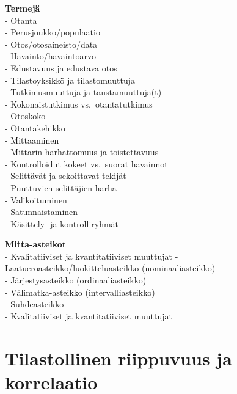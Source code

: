 \documentclass[
]{book}
\begin{document}
\textbf{Termejä}\\
- Otanta\\
- Perusjoukko/populaatio\\
- Otos/otosaineisto/data\\
- Havainto/havaintoarvo\\
- Edustavuus ja edustava otos\\
- Tilastoyksikkö ja tilastomuuttuja\\
- Tutkimusmuuttuja ja taustamuuttuja(t)\\
- Kokonaistutkimus vs.~otantatutkimus\\
- Otoskoko\\
- Otantakehikko\\
- Mittaaminen\\
- Mittarin harhattomuus ja toistettavuus\\
- Kontrolloidut kokeet vs.~suorat havainnot\\
- Selittävät ja sekoittavat tekijät\\
- Puuttuvien selittäjien harha\\
- Valikoituminen\\
- Satunnaistaminen\\
- Käsittely- ja kontrolliryhmät

\textbf{Mitta-asteikot}\\
- Kvalitatiiviset ja kvantitatiiviset muuttujat
- Laatueroasteikko/luokitteluasteikko (nominaaliasteikko)\\
- Järjestysasteikko (ordinaaliasteikko)\\
- Välimatka-asteikko (intervalliasteikko)\\
- Suhdeasteikko\\
- Kvalitatiiviset ja kvantitatiiviset muuttujat


\hypertarget{luku6}{%
\chapter{Tilastollinen riippuvuus ja korrelaatio}\label{luku6}}
\end{document}
